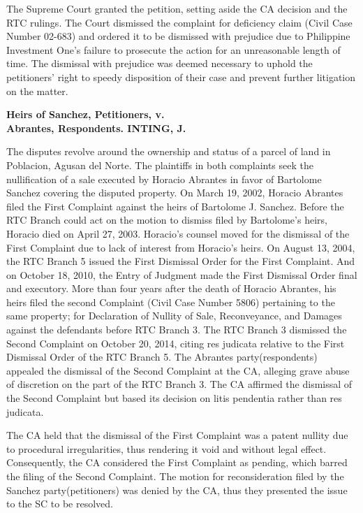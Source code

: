 \documentclass[
12pt,
oneside,
onehalfspacing,
headsepline
]{DigestCollection}
\begin{document}
The Supreme Court granted the petition, setting aside the CA decision and the RTC rulings. The Court dismissed the complaint for deficiency claim (Civil Case Number 02-683) and ordered it to be dismissed with prejudice due to Philippine Investment One's failure to prosecute the action for an unreasonable length of time. The dismissal with prejudice was deemed necessary to uphold the petitioners' right to speedy disposition of their case and prevent further litigation on the matter.

\label{dd90b450-0a0f-11ef-932c-63c852f65e48}


\noindent\textbf{Heirs of Sanchez, Petitioners, v. \\Abrantes, Respondents. INTING, J.}\vspace{0.4cm}

The disputes revolve around the ownership and status of a parcel of land in Poblacion, Agusan del Norte. The plaintiffs in both complaints seek the nullification of a sale executed by Horacio Abrantes in favor of Bartolome Sanchez covering the disputed property. On March 19, 2002, Horacio Abrantes filed the First Complaint against the heirs of Bartolome J. Sanchez. Before the RTC Branch could act on the motion to dismiss filed by Bartolome's heirs, Horacio died on April 27, 2003. Horacio's counsel moved for the dismissal of the First Complaint due to lack of interest from Horacio's heirs. On August 13, 2004, the RTC Branch 5 issued the First Dismissal Order for the First Complaint. And on October 18, 2010, the Entry of Judgment made the First Dismissal Order final and executory. More than four years after the death of Horacio Abrantes, his heirs filed the second Complaint (Civil Case Number 5806) pertaining to the same property; for Declaration of Nullity of Sale, Reconveyance, and Damages against the defendants before RTC Branch 3. The RTC Branch 3 dismissed the Second Complaint on October 20, 2014, citing res judicata relative to the First Dismissal Order of the RTC Branch 5. The Abrantes party(respondents) appealed the dismissal of the Second Complaint at the CA, alleging grave abuse of discretion on the part of the RTC Branch 3. The CA affirmed the dismissal of the Second Complaint but based its decision on litis pendentia rather than res judicata.

The CA held that the dismissal of the First Complaint was a patent nullity due to procedural irregularities, thus rendering it void and without legal effect. Consequently, the CA considered the First Complaint as pending, which barred the filing of the Second Complaint. The motion for reconsideration filed by the Sanchez party(petitioners) was denied by the CA, thus they presented the issue to the SC to be resolved.
\end{document}
